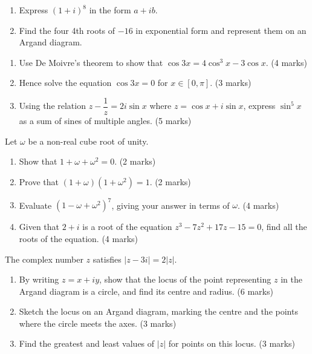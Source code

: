 \documentclass[11pt]{article}
\newcounter{popsec}
\newcounter{popsub}
\newcommand{\courssub}[1]{%
  \stepcounter{popsub}%
  \par\vspace{9pt}\noindent{\popxbold\fontsize{11.5}{13}\selectfont\color{popink}{\color{poporange}\thepopsec.\thepopsub}\hspace{6pt}#1}\par\nopagebreak\vspace{4pt}
}
\begin{document}
\begin{exercice}
\begin{enumerate}
\item Express $(1 + i)^8$ in the form $a + ib$.
\item Find the four 4th roots of $-16$ in exponential form and represent them on an Argand diagram.
\end{enumerate}
\end{exercice}

\courssub{I prepare for the GCE}

\begin{exercice}
\begin{enumerate}
\item Use De Moivre's theorem to show that $\cos 3x = 4\cos^3 x - 3\cos x$. \hfill (4 marks)
\item Hence solve the equation $\cos 3x = 0$ for $x \in [0, \pi]$. \hfill (3 marks)
\item Using the relation $z - \dfrac{1}{z} = 2i\sin x$ where $z = \cos x + i\sin x$, express $\sin^5 x$ as a sum of sines of multiple angles. \hfill (5 marks)
\end{enumerate}
\end{exercice}

\begin{exercice}
Let $\omega$ be a non-real cube root of unity.
\begin{enumerate}
\item Show that $1 + \omega + \omega^2 = 0$. \hfill (2 marks)
\item Prove that $(1 + \omega)(1 + \omega^2) = 1$. \hfill (2 marks)
\item Evaluate $(1 - \omega + \omega^2)^7$, giving your answer in terms of $\omega$. \hfill (4 marks)
\item Given that $2 + i$ is a root of the equation $z^3 - 7z^2 + 17z - 15 = 0$, find all the roots of the equation. \hfill (4 marks)
\end{enumerate}
\end{exercice}

\begin{exercice}
The complex number $z$ satisfies $|z - 3i| = 2|z|$.
\begin{enumerate}
\item By writing $z = x + iy$, show that the locus of the point representing $z$ in the Argand diagram is a circle, and find its centre and radius. \hfill (6 marks)
\item Sketch the locus on an Argand diagram, marking the centre and the points where the circle meets the axes. \hfill (3 marks)
\item Find the greatest and least values of $|z|$ for points on this locus. \hfill (3 marks)
\end{enumerate}
\end{exercice}
\end{document}
